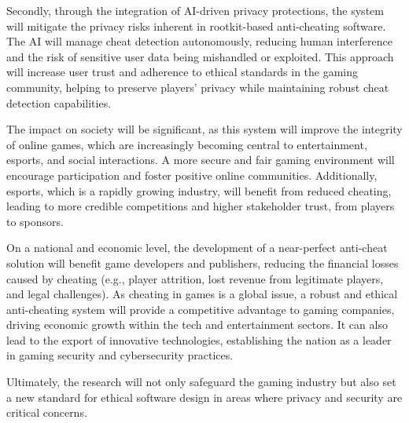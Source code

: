 \documentclass[a4paper, 12pt]{article}
\begin{document}
Secondly, through the integration of AI-driven privacy protections, the system will mitigate the privacy risks inherent in rootkit-based anti-cheating software. The AI will manage cheat detection autonomously, reducing human interference and the risk of sensitive user data being mishandled or exploited. This approach will increase user trust and adherence to ethical standards in the gaming community, helping to preserve players' privacy while maintaining robust cheat detection capabilities.

The impact on society will be significant, as this system will improve the integrity of online games, which are increasingly becoming central to entertainment, esports, and social interactions. A more secure and fair gaming environment will encourage participation and foster positive online communities. Additionally, esports, which is a rapidly growing industry, will benefit from reduced cheating, leading to more credible competitions and higher stakeholder trust, from players to sponsors.

On a national and economic level, the development of a near-perfect anti-cheat solution will benefit game developers and publishers, reducing the financial losses caused by cheating (e.g., player attrition, lost revenue from legitimate players, and legal challenges). As cheating in games is a global issue, a robust and ethical anti-cheating system will provide a competitive advantage to gaming companies, driving economic growth within the tech and entertainment sectors. It can also lead to the export of innovative technologies, establishing the nation as a leader in gaming security and cybersecurity practices.

Ultimately, the research will not only safeguard the gaming industry but also set a new standard for ethical software design in areas where privacy and security are critical concerns.


{}
\end{document}
